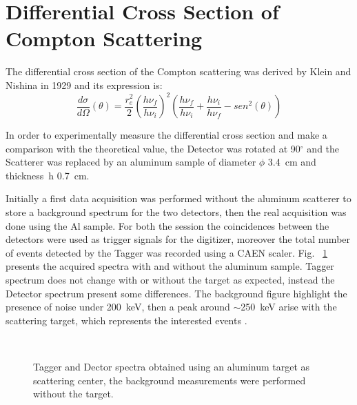 \newpage
\section*{Differential Cross Section of Compton Scattering}
The differential cross section of the Compton scattering was derived by Klein and Nishina in 1929 and its expression is:
\begin{equation*}
	\frac{d\sigma}{d\Omega}(\theta)=\frac{r_e ^2}{2}\left(\frac{h \nu_f}{h \nu_i}\right)^2\left(\frac{h \nu_f}{h \nu_i}+\frac{h \nu_i}{h \nu_f}-sen^2(\theta)\right)
\end{equation*}


In order to experimentally measure the differential cross section and make a comparison with the theoretical value, the Detector was rotated at 90$^\circ$ and the Scatterer was replaced by an aluminum sample of  diameter $\phi$ 3.4~cm and thickness~h 0.7~cm.  

Initially  a first data acquisition was performed without the aluminum scatterer to store a background spectrum for the two detectors, then the real acquisition was done using the Al sample. For both the session the coincidences between the detectors were used as trigger signals for the digitizer, moreover the total number of events detected by the Tagger was recorded using a CAEN scaler. Fig.~ \ref{Fig:CrossSection_spectra} presents the acquired spectra with and without the aluminum sample. Tagger spectrum does not change with or without the target as expected, instead the Detector spectrum present some differences. The background figure highlight the presence of noise under 200~keV, then a peak around $\sim$250~keV arise with the scattering target, which represents the interested events .

\begin{figure}[h!]
	\centering
	 \quad
	 \quad
	 \quad
	\\
	\caption{Tagger and Dector spectra obtained using an aluminum target as scattering center, the background measurements were performed without the target.}
	\label{Fig:CrossSection_spectra}
\end{figure}
\newpage

